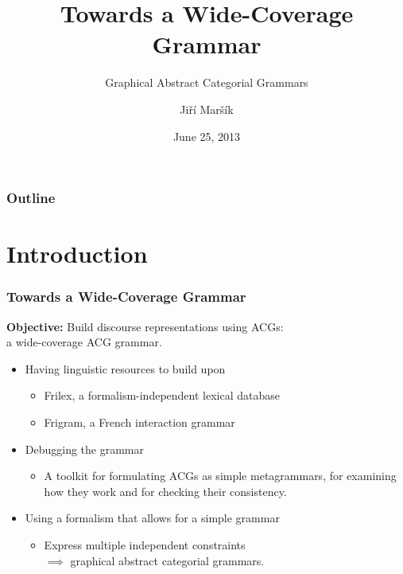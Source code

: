 \documentclass{beamer}
\begin{document}
\title[G-ACGs]{Towards a Wide-Coverage Grammar}
\subtitle{Graphical Abstract Categorial Grammars}
\author{Ji\v{r}\'{i} Mar\v{s}\'{i}k}
\date[June 2013]{June 25, 2013}

\frame{\titlepage \setcounter{framenumber}{1}}

\begin{frame}
\frametitle{Outline}
\tableofcontents
\end{frame}

\section{Introduction}

\begin{frame}
  \frametitle{Towards a Wide-Coverage Grammar}

  \textbf{Objective:} Build discourse representations using ACGs: \\a
  wide-coverage ACG grammar.

  \vfill

  \begin{itemize}
  \item Having linguistic resources to build upon
    \begin{itemize}
    \item Frilex, a formalism-independent lexical database
    \item Frigram, a French interaction grammar
    \end{itemize}
    \vfill
  \item Debugging the grammar
    \begin{itemize}
    \item A toolkit for formulating ACGs as simple metagrammars, for
      examining how they work and for checking their consistency.
    \end{itemize}
    \vfill
  \item Using a formalism that allows for a simple grammar
    \begin{itemize}
    \item Express multiple independent constraints \\ $\implies$ graphical abstract categorial grammars.
    \end{itemize}
  \end{itemize}
\end{frame}
\end{document}
